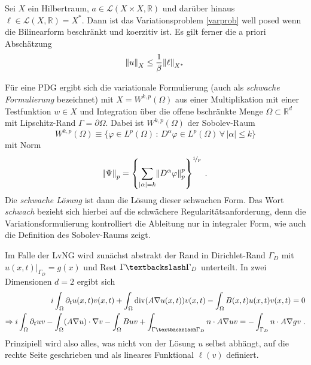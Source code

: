 \begin{satz}\label{laxmilgram}
  Sei $X$ ein Hilbertraum, $a \in \mathcal{L}(X\times X, \mathbb{R})$ und darüber hinaus ${\ell\in\mathcal{L}(X,\mathbb{R})=X^*}$. Dann ist das Variationsproblem \ref{varprob} well posed wenn die Bilinearform beschränkt und koerzitiv ist. Es gilt ferner die a priori Abschätzung
  \begin{equation}
    \norm{u}_X \leq \frac{1}{\beta} \norm{\ell}_{X^*}
  \end{equation}
\end{satz}
 Für eine PDG ergibt sich die variationale Formulierung (auch als \emph{schwache Formulierung} bezeichnet) mit ${X=W^{k,p}(\Omega)}$ aus einer Multiplikation mit einer Testfunktion ${w\in X}$ und Integration über die offene bschränkte Menge ${\Omega \subset \mathbb{R}^d}$ mit Lipschitz-Rand $\Gamma = \partial\Omega$.
 Dabei ist ${W^{k,p}(\Omega)}$ der Sobolev-Raum
 \begin{equation*}
   W^{k,p}(\Omega) \equiv \{ \varphi \in L^p(\Omega) \, : \, D^{\alpha}\varphi \in L^p(\Omega) \, \forall \, |\alpha| \leq k\}
 \end{equation*}
 mit Norm
 \begin{equation*}
   \norm{\Psi}_p = \left\{ \sum_{|\alpha|=k}\norm{D^{\alpha}\varphi}_p^p\right\}^{\nicefrac{1}{p}} \; .
 \end{equation*}
 Die \emph{schwache Lösung} ist dann die Lösung dieser schwachen Form. Das Wort \emph{schwach} bezieht sich hierbei auf die schwächere Regularitätsanforderung, denn die Variationsformulierung kontrolliert die Ableitung nur in integraler Form, wie auch die Definition des Sobolev-Raums zeigt.

 Im Falle der LvNG wird zunächst abstrakt der Rand in Dirichlet-Rand $\Gamma_D$ mit ${u(x,t)|_{\Gamma_D} = g(x)}$ und Rest ${\Gamma\textbackslash\Gamma_D}$ unterteilt. In zwei Dimensionen $d=2$ ergibt sich
 \begin{align}
              i \int_{\Omega} \partial_t u(x,t) v(x,t) + \int_{\Omega}\operatorname{div}(A\nabla u(x,t)) v(x,t) - \int_{\Omega}B(x,t) u(x,t) v(x,t) = 0 \\
  \Rightarrow i \int_{\Omega} \partial_t u v - \int_{\Omega}(A\nabla u)\cdot\nabla v - \int_{\Omega}B u v + \int_{\Gamma\textbackslash\Gamma_D} n \cdot A\nabla u v = - \int_{\Gamma_D} n \cdot A\nabla g v \; .
 \end{align}
 Prinzipiell wird also alles, was nicht von der Lösung $u$ selbst abhängt, auf die rechte Seite geschrieben und als lineares Funktional $\ell(v)$ definiert.

